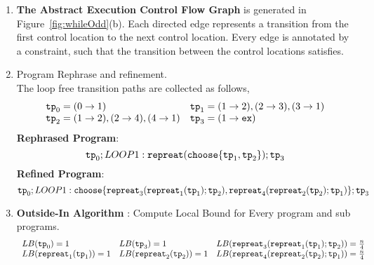   \begin{enumerate}
    \item  \textbf{The Abstract Execution Control Flow Graph} is generated in Figure~\ref{fig:whileOdd}(b).
    Each directed edge represents a transition from the first control location to the next control location.
    Every edge is annotated by a constraint, such that the transition between the control locations satisfies.
  
  \item Program Rephrase and refinement. 
  \\
  The loop free transition paths are collected as follows,
  \[
    \begin{array}{ll}
      \mathtt{tp}_0 = (0 \to 1)
      &
      \mathtt{tp}_1 = (1 \to 2), (2 \to 3), (3 \to 1)
      \\
      \mathtt{tp}_2 = (1 \to 2), (2 \to 4), (4 \to 1)
      &
      \mathtt{tp}_3 = (1 \to \mathtt{ex})
    \end{array}
    \]
  \textbf{Rephrased Program}:
  \[
  \mathtt{tp}_0 ; LOOP1: \mathtt{repreat}(\mathtt{choose}\{\mathtt{tp}_1, \mathtt{tp}_2 \}); \mathtt{tp}_3
  \]
  \textbf{Refined Program}:
  \[
    \mathtt{tp}_0 ; LOOP1: \mathtt{choose}\{\mathtt{repreat}_3(\mathtt{repreat}_1(\mathtt{tp}_1); \mathtt{tp}_2) , \mathtt{repreat}_4(\mathtt{repreat}_2(\mathtt{tp}_2); \mathtt{tp}_1) \}; \mathtt{tp}_3
    \]
  \item \textbf{Outside-In Algorithm} : Compute Local Bound for Every program and sub programs.
  \[
    \begin{array}{lll}
      LB(\mathtt{tp}_0) = 1
      &
      LB(\mathtt{tp}_3) = 1
      &
      LB(\mathtt{repreat}_3(\mathtt{repreat}_1(\mathtt{tp}_1); \mathtt{tp}_2)) = \frac{n}{4} 
      \\
      LB(\mathtt{repreat}_1(\mathtt{tp}_1)) = 1 
      &
      LB(\mathtt{repreat}_2(\mathtt{tp}_2)) = 1 
      &
      LB(\mathtt{repreat}_4(\mathtt{repreat}_2(\mathtt{tp}_2); \mathtt{tp}_1)) = \frac{n}{4}
    \end{array}
    \]

\end{enumerate}
